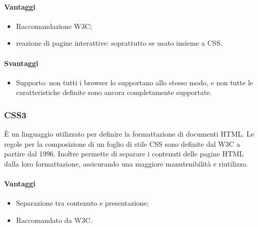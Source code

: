 \paragraph{Vantaggi}
\begin{itemize}
\item Raccomandazione W3C;
\item reazione di pagine interattive: soprattutto se usato insieme a CSS.
\end{itemize}

\paragraph{Svantaggi}
\begin{itemize}
\item Supporto: non tutti i browser lo supportano allo stesso modo, e non tutte le caratteristiche definite sono ancora completamente supportate.
\end{itemize}

\subsubsection{CSS3}
È un linguaggio utilizzato per definire la formattazione di documenti HTML.
Le regole per la composizione di un foglio di stile CSS sono definite dal W3C
a partire dal 1996. Inoltre permette di separare i contenuti delle pagine HTML dalla loro formattazione, assicurando una maggiore manutenibilità e riutilizzo.

\paragraph{Vantaggi}
\begin{itemize}
\item Separazione tra contenuto e presentazione;
\item Raccomandato da W3C.
\end{itemize}
